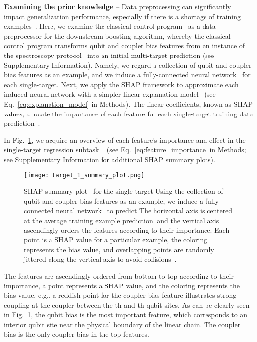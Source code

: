 \documentclass[aps,twocolumn,superscriptaddress,floatfix,preprintnumbers,showkeys]{revtex4}
\begin{document}
\textbf{Examining the prior knowledge} -- Data preprocessing can significantly impact generalization performance, especially if there is a shortage of training examples~\cite{Erhan_2010, Sklearn_2011}. Here, we examine the classical control program~\cite{Roushan_2017, Neill_2018, Chiaro_2019} as a data preprocessor for the downstream boosting algorithm, whereby the classical control program transforms  qubit and  coupler bias features from an instance of the spectroscopy protocol~\cite{Roushan_2017} into an initial multi-target prediction (see Supplementary Information). Namely, we regard a collection of  qubit and  coupler bias features as an example, and we induce a fully-connected neural network~\cite{Sklearn_2011} for each single-target. Next, we apply the SHAP framework to approximate each induced neural network with a simpler linear explanation model~\cite{Lundberg_2017} (see Eq.~\ref{eq:explanation_model} in Methods). The linear coefficients, known as SHAP values, allocate the importance of each feature for each single-target training data prediction~\cite{Lundberg_2017, Molnar_2020}. 

In Fig.~\ref{fig:shap}, we acquire an overview of each feature's importance and effect in the single-target regression subtask ~\cite{Lundberg_2017, Molnar_2020} (see Eq.~\ref{eq:feature_importance} in Methods; see Supplementary Information for additional SHAP summary plots).
\begin{figure}
\centering
\texttt{[image: target\_1\_summary\_plot.png]}
\caption{SHAP summary plot~\cite{Lundberg_2017} for the single-target  Using the collection of  qubit and coupler bias features as an example, we induce a fully connected neural network~\cite{Sklearn_2011} to predict  The horizontal axis is centered at the average training example prediction, and the vertical axis ascendingly orders the features according to their importance. Each point is a SHAP value for a particular example, the coloring represents the bias value, and overlapping points are randomly jittered along the vertical axis to avoid collisions~\cite{Lundberg_2017, Molnar_2020}.}
\label{fig:shap}
\end{figure}
The features are ascendingly ordered from bottom to top according to their importance, a point represents a SHAP value, and the coloring represents the bias value, e.g., a reddish point for the coupler  bias feature illustrates strong coupling at the coupler between the th and th qubit sites. As can be clearly seen in Fig.~\ref{fig:shap}, the qubit  bias is the most important feature, which corresponds to an interior qubit site near the physical boundary of the linear chain. The coupler  bias is the only coupler bias in the top  features. 
\end{document}
